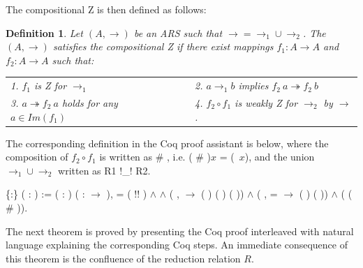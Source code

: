 \documentclass[a4paper]{article}
\newcommand{\tto}{\twoheadrightarrow}
\newtheorem{definition}{Definition}[section]
\begin{document}
The compositional Z is then defined as follows:

\begin{definition}\cite{Nakazawa-Fujita2016}
  Let $(A,\to)$ be an ARS such that $\to = \to_1 \cup \to_2$. The
  $(A,\to)$ satisfies the compositional Z if there exist mappings
  $f_1:A \to A$ and $f_2:A \to A$ such that:
  \begin{tabular}{lll}
  1. $f_1$ is Z for $\to_1$ && 2. $a \to_1 b$ implies $f_2\ a \tto f_2\ b$ \\
  3. $a \tto f_2\ a$ holds for any $a \in Im(f_1)$ &&
  4. $f_2\circ f_1$ is weakly Z for $\to_2$ by $\to$.
  \end{tabular}
\end{definition}

The corresponding definition in the Coq proof assistant is below,
where the composition of $f_2\circ f_1$ is written as 
\# , i.e. ( \# )$x$ =
(\ $x$), and the union $\to_1 \cup \to_2$
written as R1 !\_! R2.

\begin{coqdoccode}
  \coqdocemptyline \coqdocnoindent {}
   \{:\} (
  : ) := \coqdoctac{\ensuremath{\exists}}
  ( :  )
  ( : 
  \ensuremath{\rightarrow} ),  =
  ( !\coqdocvar{\_}! ) \ensuremath{\land}
    
  \ensuremath{\land} (\coqdockw{\ensuremath{\forall}} 
  ,   
  \ensuremath{\rightarrow} ( )
  ( ) ( ))
  \ensuremath{\land} (\coqdockw{\ensuremath{\forall}} 
  ,  =  
  \ensuremath{\rightarrow} ( )
   ( )) \ensuremath{\land}
  (  
  ( \# )).\coqdoceol \coqdocemptyline
  \coqdocemptyline
\end{coqdoccode}

The next theorem is proved by presenting the Coq proof interleaved with natural language explaining the corresponding Coq steps. An immediate consequence of this theorem is the confluence of the reduction relation $R$.
\end{document}
